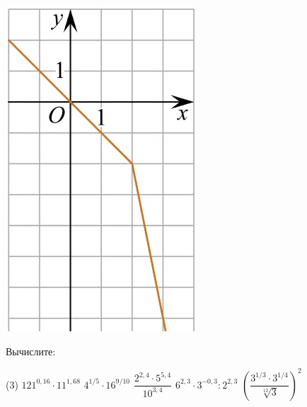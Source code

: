 \begin{homework}[number=3]
\begin{listofex}
\begin{minipage}[c]{0.1\textwidth}
				\includegraphics[align=t, width=\textwidth]{../../pics/G101M4C5-9.jpg}
			\end{minipage}
			\item Вычислите:
			\begin{tasks}(3)
				\task \( 121^{0,16}\cdot11^{1,68} \)
				\task \( 4^{1/5}\cdot16^{9/10} \)
				\task \( \dfrac{2^{2,4}\cdot5^{5,4}}{10^{3,4}} \)
				\task \( 6^{2,3}\cdot3^{-0,3}:2^{2,3} \)
				\task \( \left( \dfrac{3^{1/3}\cdot3^{1/4}}{\sqrt[12]{3}} \right)^2  \)
			\end{tasks}
		\end{listofex}
	\end{homework}
	
